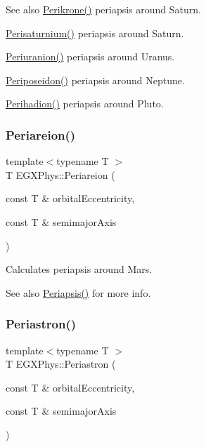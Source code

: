 \begin{DoxySeeAlso}{See also}
\hyperlink{group___e_g_x_phys-_periapsis_gaa56f74c44a3583b8f0d13b821c1d7422}{Perikrone()} periapsis around Saturn. 

\hyperlink{group___e_g_x_phys-_periapsis_ga60a50d09d29ebe47cbbfc125c2ea42bf}{Perisaturnium()} periapsis around Saturn. 

\hyperlink{group___e_g_x_phys-_periapsis_gab8b8131a617dd2d2a4de1d48accd7442}{Periuranion()} periapsis around Uranus. 

\hyperlink{group___e_g_x_phys-_periapsis_ga237e7af3794202c67e65f64f4c8abc2a}{Periposeidon()} periapsis around Neptune. 

\hyperlink{group___e_g_x_phys-_periapsis_gafb16e46e55078b38604eef0d7c7c40c4}{Perihadion()} periapsis around Pluto. 
\end{DoxySeeAlso}
\mbox{\label{group___e_g_x_phys-_periapsis_ga0617ba07a30b0fd0544c02f691bfae26}} 
\subsubsection{\texorpdfstring{Periareion()}{Periareion()}}
{\footnotesize\ttfamily template$<$typename T $>$ \\
T E\+G\+X\+Phys\+::\+Periareion (\begin{DoxyParamCaption}\item[{const T \&}]{orbital\+Eccentricity,  }\item[{const T \&}]{semimajor\+Axis }\end{DoxyParamCaption})}



Calculates periapsis around Mars. 

\begin{DoxySeeAlso}{See also}
\hyperlink{group___e_g_x_phys-_periapsis_ga4414ac75539371ec874a3d25cad6c9fe}{Periapsis()} for more info. 
\end{DoxySeeAlso}
\mbox{\label{group___e_g_x_phys-_periapsis_ga477de6824cbb5986cdae923141e21648}} 
\subsubsection{\texorpdfstring{Periastron()}{Periastron()}}
{\footnotesize\ttfamily template$<$typename T $>$ \\
T E\+G\+X\+Phys\+::\+Periastron (\begin{DoxyParamCaption}\item[{const T \&}]{orbital\+Eccentricity,  }\item[{const T \&}]{semimajor\+Axis }\end{DoxyParamCaption})}



